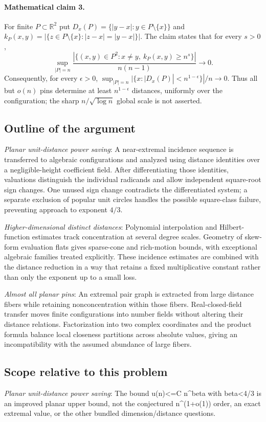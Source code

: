\documentclass[11pt]{article}
\begin{document}
\paragraph{Mathematical claim 3.} For finite $P\subset\mathbb R^2$ put $D_x(P)=\{|y-x|:y\in P\setminus\{x\}\}$ and $k_P(x,y)=|\{z\in P\setminus\{x\}:|z-x|=|y-x|\}|$. The claim states that for every $s>0$, \[\sup_{|P|=n}\frac{|\{(x,y)\in P^2:x\ne y,\ k_P(x,y)\ge n^s\}|}{n(n-1)}\longrightarrow0.\] Consequently, for every $\epsilon>0$, $\sup_{|P|=n}|\{x:|D_x(P)|<n^{1-\epsilon}\}|/n\to0$. Thus all but $o(n)$ pins determine at least $n^{1-\epsilon}$ distances, uniformly over the configuration; the sharp $n/\sqrt{\log n}$ global scale is not asserted.

\subsection{Outline of the argument}
\textit{Planar unit-distance power saving}: A near-extremal incidence sequence is transferred to algebraic configurations and analyzed using distance identities over a negligible-height coefficient field. After differentiating those identities, valuations distinguish the individual radicands and allow independent square-root sign changes. One unused sign change contradicts the differentiated system; a separate exclusion of popular unit circles handles the possible square-class failure, preventing approach to exponent $4/3$.

\textit{Higher-dimensional distinct distances}: Polynomial interpolation and Hilbert-function estimates track concentration at several degree scales. Geometry of skew-form evaluation flats gives sparse-cone and rich-motion bounds, with exceptional algebraic families treated explicitly. These incidence estimates are combined with the distance reduction in a way that retains a fixed multiplicative constant rather than only the exponent up to a small loss.

\textit{Almost all planar pins}: An extremal pair graph is extracted from large distance fibers while retaining nonconcentration within those fibers. Real-closed-field transfer moves finite configurations into number fields without altering their distance relations. Factorization into two complex coordinates and the product formula balance local closeness partitions across absolute values, giving an incompatibility with the assumed abundance of large fibers.

\subsection{Scope relative to this problem}
\textit{Planar unit-distance power saving}: The bound u(n)<=C n\textasciicircum{}beta with beta<4/3 is an improved planar upper bound, not the conjectured n\textasciicircum{}(1+o(1)) order, an exact extremal value, or the other bundled dimension/distance questions.
\end{document}
